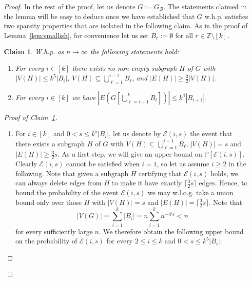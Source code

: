 \documentclass[a4paper,10pt]{amsart}
\newtheorem{claim}[theorem]{Claim}
\begin{document}
\begin{proof}
In the rest of the proof, let us denote $G:=G_{\mathcal{B}}$. The statements claimed in the lemma will be easy to deduce once we have established that $G$ w.h.p. satisfies two sparsity properties that are isolated in the following claim. As in the proof of Lemma~\ref{lem:smallish}, for convenience let us set $B_r:=\emptyset$ for all $r\in\mathbb{Z}\setminus [k]$. 
\begin{claim}\label{cl2}
W.h.p. as $n\rightarrow \infty$ the following statements hold:
\begin{enumerate}
    \item For every $i\in [k]$ there exists no non-empty subgraph $H$ of $G$ with $|V(H)|\le k^5|B_i|$, $V(H)\subseteq \bigcup_{\ell=1}^{i-1}B_\ell$, and $|E(H)|\ge \frac{3}{2}|V(H)|$. 
    \item For every $i\in [k]$ we have
    $\left|E\left(G\left[\bigcup_{\ell=i+1}^{k}B_\ell\right]\right)\right|\le k^4|B_{i+1}|$.
\end{enumerate}
\end{claim}
\begin{proof}[Proof of Claim~\ref{cl2}]
\noindent
\begin{enumerate}
    \item For $i\in [k]$ and $0<s\le k^5|B_i|$, let us denote by $\mathcal{E}(i,s)$ the event that there exists a subgraph $H$ of $G$ with $V(H)\subseteq \bigcup_{\ell=1}^{i-1}B_\ell$, $|V(H)|=s$ and $|E(H)|\ge \frac{3}{2}s$. As a first step, we will give an upper bound on $\mathbb{P}[\mathcal{E}(i,s)]$. Clearly $\mathcal{E}(i,s)$ cannot be satisfied when $i=1$, so let us assume $i\ge 2$ in the following. Note that given a subgraph $H$ certifying that $\mathcal{E}(i,s)$ holds, we can always delete edges from $H$ to make it have exactly $\lceil \frac{3}{2}s\rceil$ edges.
    Hence, to bound the probability of the event $\mathcal{E}(i,s)$ we may w.l.o.g. take a union bound only over those $H$ with $|V(H)|=s$ and $|E(H)|=\lceil \frac{3}{2}s\rceil$. Note that $$|V(G)|=\sum_{i=1}^{k}{|B_i|}=n\sum_{i=1}^{k}{n^{-4^i\varepsilon}}<n$$ for every sufficiently large $n$. 
    We therefore obtain the following upper bound on the probability of $\mathcal{E}(i,s)$ for every $2\le i\le k$ and $0<s\le k^5|B_i|$:


\end{enumerate}
\end{proof}
\end{proof}
\end{document}
